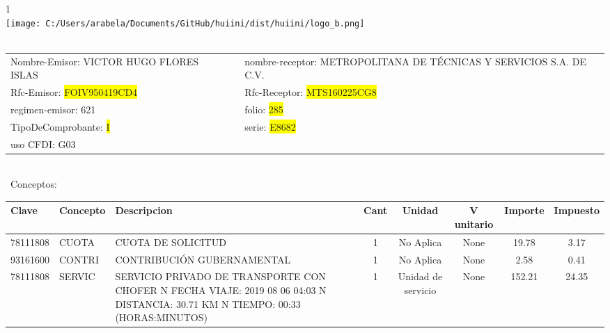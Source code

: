 \documentclass{article}
\begin{document}
\hspace{18cm} 1\\
\texttt{[image: C:/Users/arabela/Documents/GitHub/huiini/dist/huiini/logo\_b.png]}
\bigskip\\\
\begin{tabular}{p{11cm}p{1cm}p{8cm}}

Nombre-Emisor: VICTOR HUGO FLORES ISLAS && nombre-receptor: METROPOLITANA DE TÉCNICAS Y SERVICIOS S.A. DE C.V.\\

Rfc-Emisor: \colorbox{yellow}{ FOIV950419CD4 } & & Rfc-Receptor: \colorbox{yellow}{ MTS160225CG8 }\\

regimen-emisor: 621 & & folio: \colorbox{yellow}{ 285 }\\

TipoDeComprobante: \colorbox{yellow}{ I } & & serie: \colorbox{yellow}{ E8682 }\\

uso CFDI: G03\\



\end{tabular}
\bigskip\bigskip\bigskip\\\
Conceptos:\\
\begin{tabular}{|p{1.5cm}|p{3.6cm}|p{3.6cm}|c|c|c|c|c|}
\hline
Clave & Concepto & Descripcion & Cant & Unidad & V unitario & Importe & Impuesto \\
\hline

78111808 & CUOTA  & CUOTA DE SOLICITUD & 1 & No Aplica & None & 19.78 &  3.17 \\
\hline

93161600 & CONTRI & CONTRIBUCIÓN GUBERNAMENTAL & 1 & No Aplica & None & 2.58 &  0.41 \\
\hline

78111808 & SERVIC & SERVICIO PRIVADO DE TRANSPORTE CON CHOFER  N FECHA VIAJE: 2019 08 06 04:03  N DISTANCIA: 30.71 KM  N TIEMPO: 00:33 (HORAS:MINUTOS) & 1 & Unidad de servicio & None & 152.21 &  24.35 \\
\hline

\end{tabular}\\
\bigskip
\end{document}
